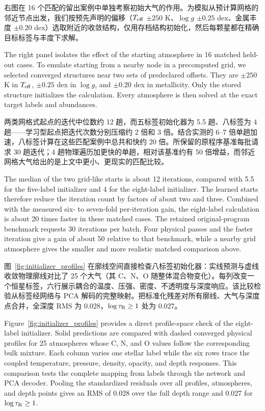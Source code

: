 右图在 16 个匹配的留出案例中单独考察初始大气的作用。为模拟从预计算网格的邻近节点出发，我们按预先声明的偏移（$T_{\rm eff}$ $\pm250$ K、$\log g$ $\pm0.25$ dex、金属丰度 $\pm0.20$ dex）选取附近的收敛结构，仅用存档结构初始化，然后每颗星都在精确目标标签与丰度下求解。

\begin{EN}
The right panel isolates the effect of the starting atmosphere in 16 matched
held-out cases. To emulate starting from a nearby node in a precomputed grid,
we selected converged structures near two sets of predeclared offsets. They are
$\pm250$ K in $T_{\rm eff}$, $\pm0.25$ dex in $\log g$, and $\pm0.20$ dex in
metallicity. Only the stored structure
initializes the calculation. Every atmosphere is then solved at the exact
target labels and abundances.
\end{EN}

两类网格式起点的迭代中位数约 12 趟，而五标签初始化器为 5.5 趟、八标签为 4 趟——学习型起点把迭代次数分别压缩约 2 倍和 3 倍。结合实测的 6--7 倍单趟加速，八标签计算在这些匹配案例中总共和快约 20 倍。所保留的原程序基准每批请求 30 趟迭代；4 趟物理遍历加更快的单趟，相对该基准约有 50 倍增益，而邻近网格大气给出的是上文中更小、更现实的匹配比较。

\begin{EN}
The median of the two grid-like starts is about 12 iterations, compared with
5.5 for the five-label initializer and 4 for the eight-label initializer. The
learned starts therefore reduce the iteration count by factors of about two and
three. Combined with the measured six- to seven-fold per-iteration gain, the
eight-label calculation is about 20 times faster in these matched cases. The
retained original-program benchmark requests 30 iterations per batch. Four
physical passes and the faster iteration give a gain of about 50 relative to
that benchmark, while a nearby grid atmosphere gives the smaller and more realistic
matched comparison above.
\end{EN}

图~\ref{fig:initializer_profiles} 在廓线空间直接检查八标签初始化器：实线预测与虚线收敛物理廓线对比了 25 个大气（其 C、N、O 随整体混合物变化）。每列改变一个恒星标签，六行展示耦合的温度、压强、密度、不透明度与深度响应。该比较检验从标签经网络与 PCA 解码的完整映射。把标准化残差对所有廓线、大气与深度点合并，全深度 RMS 为 0.028，$\log\tau_{\rm R}\geq1$ 处为 0.027。

\begin{EN}
Figure~\ref{fig:initializer_profiles} provides a direct profile-space check of
the eight-label initializer. Solid predictions are compared with dashed
converged physical profiles for 25 atmospheres whose C, N, and O values follow
the corresponding bulk mixture. Each column varies one stellar label while the
six rows trace the coupled temperature, pressure, density, opacity, and depth
responses. This comparison tests the complete mapping from labels through the
network and PCA decoder. Pooling the standardized residuals over all profiles,
atmospheres, and depth points gives an RMS of 0.028 over the full depth range
and 0.027 for $\log\tau_{\rm R}\geq1$.
\end{EN}

